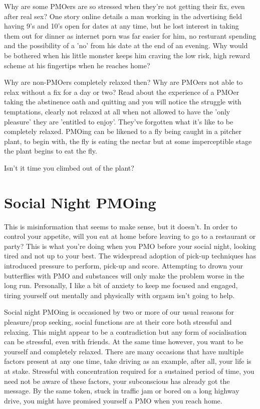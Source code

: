 \documentclass[easypeasy.tex]{subfiles}
\begin{document}
Why are some PMOers are so stressed when they're not getting their fix, even after real sex? One story online details a man working in the advertising field having 9's and 10's open for dates at any time, but he lost interest in taking them out for dinner as internet porn was far easier for him, no resturant spending and the possibility of a 'no' from his date at the end of an evening. Why would be bothered when his little monster keeps him craving the low risk, high reward scheme at his fingertips when he reaches home?

Why are non-PMOers completely relaxed then? Why are PMOers not able to relax without a fix for a day or two? Read about the experience of a PMOer taking the abstinence oath and quitting and you will notice the struggle with temptations, clearly not relaxed at all when not allowed to have the 'only pleasure' they are 'entitled to enjoy'. They've forgotten what it's like to be completely relaxed. PMOing can be likened to a fly being caught in a pitcher plant, to begin with, the fly is eating the nectar but at some imperceptible stage the plant begins to eat the fly.

Isn't it time you climbed out of the plant?

\section{Social Night PMOing}

This is misinformation that seems to make sense, but it doesn't. In order to control your appetite, will you eat at home before leaving to go to a restaurant or party? This is what you're doing when you PMO before your social night, looking tired and not up to your best. The widespread adoption of pick-up techniques has introduced pressure to perform, pick-up and score. Attempting to drown your butterflies with PMO and substances will only make the problem worse in the long run. Personally, I like a bit of anxiety to keep me focused and engaged, tiring yourself out mentally and physically with orgasm isn't going to help.

Social night PMOing is occasioned by two or more of our usual reasons for pleasure/prop seeking, social functions are at their core both stressful and relaxing. This might appear to be a contradiction but any form of socialisation can be stressful, even with friends. At the same time however, you want to be yourself and completely relaxed. There are many occasions that have multiple factors present at any one time, take driving as an example, after all, your life is at stake. Stressful with concentration required for a sustained period of time, you need not be aware of these factors, your subconscious has already got the message. By the same token, stuck in traffic jam or bored on a long highway drive, you might have promised yourself a PMO when you reach home.
\end{document}
